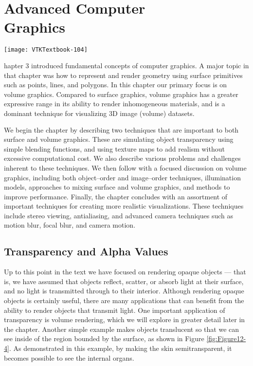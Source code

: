 \chapter[Advanced Computer Graphics]{Advanced Computer\\ Graphics}
\label{chap:advanced_computer_graphics}

\vspace{-9\baselineskip} %
\hfill
 \begin{minipage}{0.5\textwidth}
 \centering
 \texttt{[image: VTKTextbook-104]}
 \end{minipage}
\vspace{2\baselineskip}

hapter 3 introduced fundamental concepts of computer graphics.
A major topic in that chapter was how to represent and render geometry using surface primitives such as points, lines, and polygons.
In this chapter our primary focus is on volume graphics.
Compared to surface graphics, volume graphics has a greater expressive range in its ability to render inhomogeneous materials, and is a dominant technique for visualizing 3D image (volume) datasets.

We begin the chapter by describing two techniques that are important to both surface and volume graphics.
These are simulating object transparency using simple blending functions, and using texture maps to add realism without excessive computational cost.
We also describe various problems and challenges inherent to these techniques.
We then follow with a focused discussion on volume graphics, including both object--order and image--order techniques, illumination models, approaches to mixing surface and volume graphics, and methods to improve performance.
Finally, the chapter concludes with an assortment of important techniques for creating more realistic visualizations.
These techniques include stereo viewing, antialiasing, and advanced camera techniques such as motion blur, focal blur, and camera motion.

\section{Transparency and Alpha Values}
\label{sec:transparency_alpha}

Up to this point in the text we have focused on rendering opaque objects --- that is, we have assumed that objects reflect, scatter, or absorb light at their surface, and no light is transmitted through to their interior. Although rendering opaque objects is certainly useful, there are many applications that can benefit from the ability to render objects that transmit light. One important application of transparency is volume rendering, which we will explore in greater detail later in the chapter. Another simple example makes objects translucent so that we can see inside of the region bounded by the surface, as shown in Figure \ref{fig:Figure12-4}. As demonstrated in this example, by making the skin semitransparent, it becomes possible to see the internal organs.

